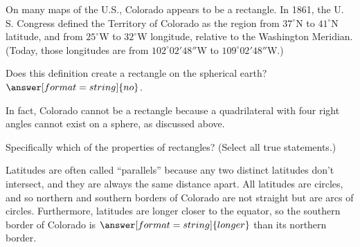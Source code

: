 \documentclass{ximera}
\begin{document}









\begin{problem}
On many maps of the U.S., Colorado appears to be a rectangle.  In 1861, the U. S. Congress defined the Territory of Colorado as the region from $37^\circ$N to $41^\circ$N latitude, and from $25^\circ$W to $32^\circ$W longitude, relative to the Washington Meridian.  (Today, those longitudes are from $102^\circ02'48''$W to $109^\circ02'48''$W.) 

Does this definition create a rectangle on the spherical earth?   $\answer[format=string]{no}$.

\begin{problem}
In fact, Colorado cannot be a rectangle because a quadrilateral with four right angles cannot exist on a sphere, as discussed above.  

Specifically which of the properties of rectangles?  (Select all true statements.) 

\begin{selectAll}
\end{selectAll}

\begin{problem}

Latitudes are often called ``parallels'' because any two distinct latitudes don't intersect, and they are always the same distance apart.   All latitudes are circles, and so northern and southern borders of Colorado are not straight but are arcs of circles. Furthermore, latitudes are longer closer to the equator, so the southern border of Colorado is $\answer[format=string]{longer}$ than its northern border.  


\end{problem}
\end{problem}
\end{problem}
\end{document}
